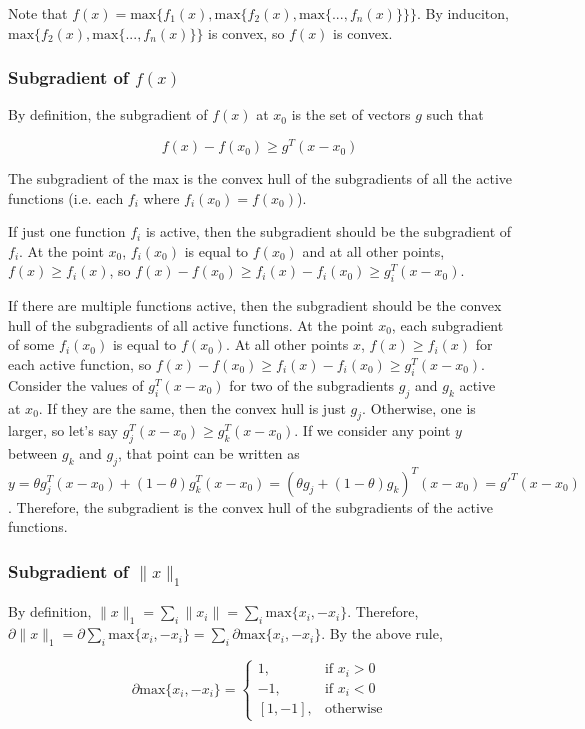 \documentclass{article}
\renewcommand\max[1]{\text{max} \lbrace #1 \rbrace}
\begin{document}
Note that $f(x) = \max{f_1(x), \max{f_2(x), \max{..., f_n(x)}}}$. By induciton, $\max{f_2(x), \max{..., f_n(x)}}$ is convex, so $f(x)$ is convex.

\subsubsection{Subgradient of $f(x)$}

By definition, the subgradient of $f(x)$ at $x_0$ is the set of vectors $g$ such that

$$f(x) - f(x_0) \geq g^T(x-x_0)$$

The subgradient of the max is the convex hull of the subgradients of all the active functions (i.e. each $f_i$ where $f_i(x_0) = f(x_0)$).

If just one function $f_i$ is active, then the subgradient should be the subgradient of $f_i$. At the point $x_0$, $f_i(x_0)$ is equal to $f(x_0)$ and at all other points, $f(x) \geq f_i(x)$, so $f(x) - f(x_0) \geq f_i(x) - f_i(x_0) \geq g_i^T(x-x_0)$.

If there are multiple functions active, then the subgradient should be the convex hull of the subgradients of all active functions. At the point $x_0$, each subgradient of some $f_i(x_0)$ is equal to $f(x_0)$. At all other points $x$, $f(x) \geq f_i(x)$ for each active function, so $f(x) - f(x_0) \geq f_i(x) - f_i(x_0) \geq g_i^T(x-x_0)$. Consider the values of $g_i^T(x-x_0)$ for two of the subgradients $g_j$ and $g_k$ active at $x_0$. If they are the same, then the convex hull is just $g_j$. Otherwise, one is larger, so let's say $g_j^T(x-x_0) \geq g_k^T(x-x_0)$. If we consider any point $y$ between $g_k$ and $g_j$, that point can be written as $y = \theta g_j^T(x-x_0) + (1-\theta) g_k^T(x-x_0) = (\theta g_j + (1-\theta) g_k)^T(x-x_0) = g'^T(x-x_0)$. Therefore, the subgradient is the convex hull of the subgradients of the active functions.

\subsubsection{Subgradient of $\|x\|_1$}

By definition, $\|x\|_1 = \sum_i \|x_i\| = \sum_i \max{x_i, -x_i}$. Therefore, $\partial \|x\|_1 = \partial \sum_i \max{x_i, -x_i} = \sum_i \partial \max{x_i, -x_i}$. By the above rule,

$$
\partial \max{x_i, -x_i} = \begin{cases}
  1,  & \text{if } x_i > 0\\
  -1, & \text{if } x_i < 0\\
  [1, -1],   & \text{otherwise}
\end{cases}
$$
\end{document}
